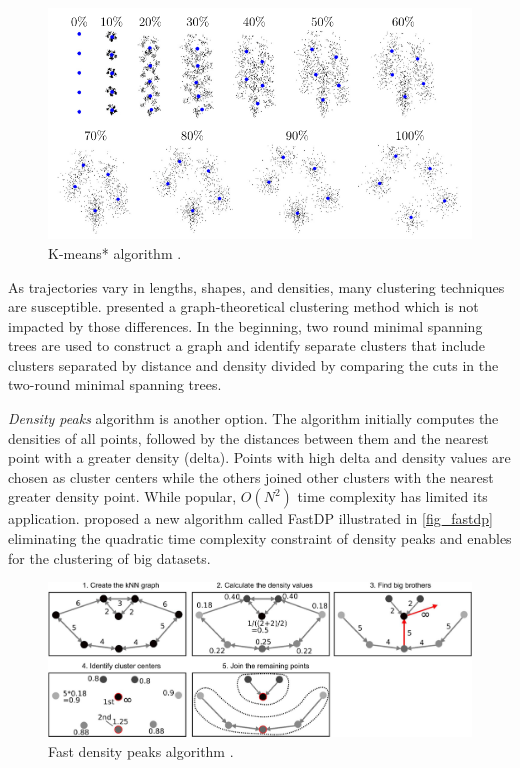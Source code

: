 \documentclass[a4paper, 12pt]{article}
\begin{document}
\begin{figure}[htbp!]
    \centering
    \includegraphics[width=1\textwidth]{gradual_algorithm.png}
    \caption{K-means* algorithm \citep{malinen2014k}.}
    \label{fig_gradual}
\end{figure}

As trajectories vary in lengths, shapes, and densities, many clustering techniques are susceptible. \citet{zhong2010graph} presented a graph-theoretical clustering method which is not impacted by those differences. In the beginning, two round minimal spanning trees are used to construct a graph and identify separate clusters that include clusters separated by distance and density divided by comparing the cuts in the two-round minimal spanning trees.

\textit{Density peaks} algorithm \citep{rodriguez2014clustering} is another option. The algorithm initially computes the densities of all points, followed by the distances between them and the nearest point with a greater density (delta). Points with high delta and density values are chosen as cluster centers while the others joined other clusters with the nearest greater density point. While popular, $O(N^2)$ time complexity has limited its application. \citet{sieranoja2019fast} proposed a new algorithm called FastDP illustrated in \autoref{fig_fastdp} eliminating the quadratic time complexity constraint of density peaks and enables for the clustering of big datasets.

\begin{figure}[htbp!]
    \centering
    \includegraphics[width=1\textwidth]{fast_density_peak.jpg}
    \caption{Fast density peaks algorithm \citep{sieranoja2019fast}.}
    \label{fig_fastdp}
\end{figure}
\end{document}
